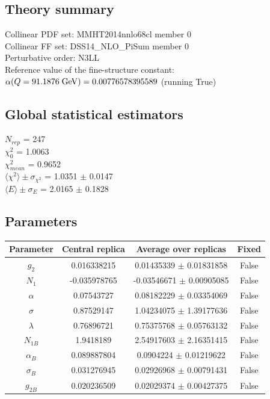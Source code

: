\documentclass[
]{article}
\begin{document}
\hypertarget{theory-summary}{%
\subsection{Theory summary}\label{theory-summary}}

Collinear PDF set: MMHT2014nnlo68cl member 0\\
Collinear FF set: DSS14\_NLO\_PiSum member 0\\
Perturbative order: N3LL\\
Reference value of the fine-structure constant:
\(\alpha(Q = 91.1876\;{\rm GeV}) = 0.00776578395589\) (running True)

\hypertarget{global-statistical-estimators}{%
\subsection{Global statistical
estimators}\label{global-statistical-estimators}}

\(N_{rep}\) = 247\\
\(\chi_{0}^2\) = 1.0063\\
\(\chi_{mean}^2\) = 0.9652\\
\(\langle\chi^2\rangle \pm \sigma_{\chi^2}\) = 1.0351 \(\pm\) 0.0147\\
\(\langle E \rangle \pm \sigma_{E}\) = 2.0165 \(\pm\) 0.1828

\hypertarget{parameters}{%
\subsection{Parameters}\label{parameters}}

\begin{longtable}[]{@{}cccc@{}}
\toprule
Parameter & Central replica & Average over replicas &
Fixed\tabularnewline
\midrule
\endhead
\(g_2\) & 0.016338215 & 0.01435339 \(\pm\) 0.01831858 &
False\tabularnewline
\(N_1\) & -0.035978765 & -0.03546671 \(\pm\) 0.00905085 &
False\tabularnewline
\(\alpha\) & 0.07543727 & 0.08182229 \(\pm\) 0.03354069 &
False\tabularnewline
\(\sigma\) & 0.87529147 & 1.04234075 \(\pm\) 1.39177636 &
False\tabularnewline
\(\lambda\) & 0.76896721 & 0.75375768 \(\pm\) 0.05763132 &
False\tabularnewline
\(N_{1B}\) & 1.9418189 & 2.54917603 \(\pm\) 2.16351415 &
False\tabularnewline
\(\alpha_B\) & 0.089887804 & 0.0904224 \(\pm\) 0.01219622 &
False\tabularnewline
\(\sigma_B\) & 0.031276945 & 0.02926968 \(\pm\) 0.00791431 &
False\tabularnewline
\(g_{2B}\) & 0.020236509 & 0.02029374 \(\pm\) 0.00427375 &
False\tabularnewline
\bottomrule
\end{longtable}
\end{document}
